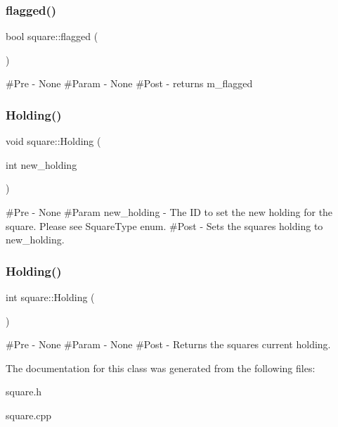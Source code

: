 \subsubsection{\texorpdfstring{flagged()}{flagged()}}
{\footnotesize\ttfamily bool square\+::flagged (\begin{DoxyParamCaption}{ }\end{DoxyParamCaption})}

\#\+Pre -\/ None \#\+Param -\/ None \#\+Post -\/ returns m\+\_\+flagged \mbox{\label{classsquare_a1f8541dab03c453d7cfc0e95687b4056}} 
\subsubsection{\texorpdfstring{Holding()}{Holding()}\hspace{0.1cm}{\footnotesize\ttfamily [1/2]}}
{\footnotesize\ttfamily void square\+::\+Holding (\begin{DoxyParamCaption}\item[{int}]{new\+\_\+holding }\end{DoxyParamCaption})}

\#\+Pre -\/ None \#\+Param new\+\_\+holding -\/ The ID to set the new holding for the square. Please see Square\+Type enum. \#\+Post -\/ Sets the square\textquotesingle{}s holding to new\+\_\+holding. \mbox{\label{classsquare_a891498f84fd9d6f4c412369fe51e7347}} 
\subsubsection{\texorpdfstring{Holding()}{Holding()}\hspace{0.1cm}{\footnotesize\ttfamily [2/2]}}
{\footnotesize\ttfamily int square\+::\+Holding (\begin{DoxyParamCaption}{ }\end{DoxyParamCaption})}

\#\+Pre -\/ None \#\+Param -\/ None \#\+Post -\/ Returns the square\textquotesingle{}s current holding. 

The documentation for this class was generated from the following files\+:\begin{DoxyCompactItemize}
\item 
square.\+h\item 
square.\+cpp\end{DoxyCompactItemize}
